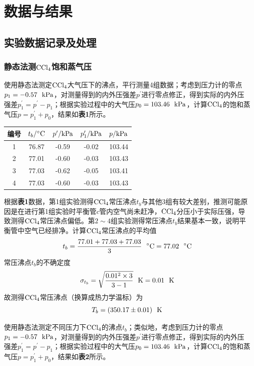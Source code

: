 \documentclass[12pt]{article}
\begin{document}
\vbox{}
 \section{数据与结果}
 \subsection{实验数据记录及处理}
 \subsubsection{静态法测$\rm CCl_{4}$饱和蒸气压}
使用静态法测定$\rm CCl_{4}$大气压下的沸点，平行测量4组数据；考虑到压力计的零点$p_{1}=-0.57\ \ {\rm kPa}$，对测量得到的内外压强差$p^{\prime}$进行零点修正，得到实际的内外压强差$p_{1}^{\prime}=p^{\prime}-p_{1}$；根据实验过程中的大气压$p_{0}=103.46\ \ {\rm kPa}$，计算$\rm CCl_{4}$的饱和蒸气压$ p=p^{\prime}_{1}+p_{0}$，结果如\textbf{表1}所示。
 \begin{table}[h]
 	\centering
 	\begin{tabular}{ccccc}
 		\toprule
 		编号 & $t_{b}/{\rm ^{\circ}C}$& $p^{\prime}/{\rm kPa}$ & $p_{1}^{\prime}/{\rm kPa}$ & $p/{\rm kPa}$  \\
 		\midrule
 		1 & 76.87 & -0.59 & -0.02 & 103.44 \\
 		2 & 77.01 & -0.60 & -0.03 & 103.43 \\
 		3 & 77.03 & -0.62 & -0.05 & 103.41 \\
 		4 & 77.03 & -0.60 & -0.03 & 103.43 \\
 		\bottomrule
 	\end{tabular}
 \end{table}
 \par
根据\textbf{表1}数据，第1组实验测得$\rm CCl_{4}$常压沸点$t_{b}$与其他3组有较大差别，推测可能原因是在进行第1组实验时平衡管$c$管内空气尚未赶净，$\rm CCl_{4}$分压小于实际压强，导致测得$\rm CCl_{4}$常压沸点偏低。第$2\sim 4$组实验测得常压沸点$t_{b}$结果基本一致，说明平衡管中空气已经排净。计算$\rm CCl_{4}$常压沸点的平均值
$$
t_{b}=\frac{77.01+77.03+77.03}{3} \ \ {\rm ^{\circ}C}=77.02\ \ {\rm {^{\circ}C}}
$$
常压沸点$t_{b}$的不确定度
$$
\sigma_{t_{b}}=\sqrt{\frac{0.01^{2}\times 3}{3-1}} \ \ {\rm K}=0.01\ \ {\rm K} 
$$
故测得$\rm CCl_{4}$常压沸点（换算成热力学温标）为
$$
T_{b}=(350.17\pm 0.01)\ \ {\rm K}
$$
\par
使用静态法测定不同压力下$\rm CCl_{4}$的沸点$t_{b}$；类似地，考虑到压力计的零点$p_{1}=-0.57\ \ {\rm kPa}$，对测量得到的内外压强差$p^{\prime}$进行零点修正，得到实际的内外压强差$p_{1}^{\prime}=p^{\prime}-p_{1}$；根据实验过程中的大气压$p_{0}=103.46\ \ {\rm kPa}$，计算$\rm CCl_{4}$的饱和蒸气压$ p=p^{\prime}_{1}+p_{0}$，结果如\textbf{表2}所示。
\end{document}
